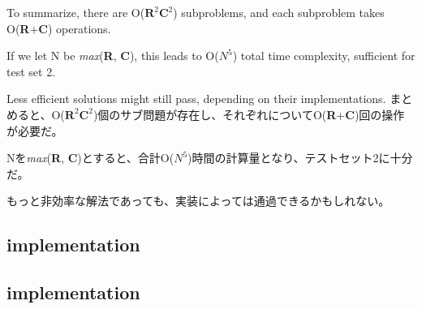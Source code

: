 \documentclass[uplatex,dvipdfmx]{jsarticle} \usepackage{amsmath,amssymb,bm}
\begin{document}
\begin{paracol}{2}
To summarize, there are O($\mathbf{R}^2\mathbf{C}^2$) subproblems, and each subproblem takes O({\bf R}+{\bf C}) operations.

If we let N be {\it max}({\bf R}, {\bf C}), this leads to O($N^5$) total time complexity, sufficient for test set 2.

Less efficient solutions might still pass, depending on their implementations.
\switchcolumn
まとめると、O($\mathbf{R}^2\mathbf{C}^2$)個のサブ問題が存在し、それぞれについてO({\bf R}+{\bf C})回の操作が必要だ。

Nを{\it max}({\bf R}, {\bf C})とすると、合計O($N^5$)時間の計算量となり、テストセット2に十分だ。

もっと非効率な解法であっても、実装によっては通過できるかもしれない。
\end{paracol}

\subsection*{implementation}


\subsection*{implementation}



\vspace{\baselineskip}
\begin{paracol}{2}
\switchcolumn
\end{paracol}
\end{document}
